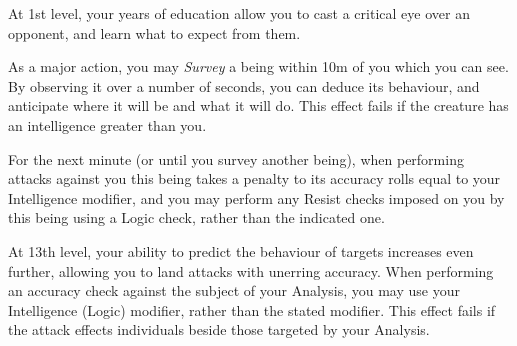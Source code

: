 {
At 1st level, your years of education allow you to cast a critical eye over an opponent, and learn what to expect from them. 

As a major action, you may {\it Survey} a being within 10m of you which you can see. By observing it over a number of seconds, you can deduce its behaviour, and anticipate where it will be and what it will do. This effect fails if the creature has an intelligence greater than you. 

For the next minute (or until you survey another being), when performing attacks against you this being takes a penalty to its accuracy rolls equal to your Intelligence modifier, and you may perform any Resist checks imposed on you by this being using a Logic check, rather than the indicated one. 


At 13th level, your ability to predict the behaviour of targets increases even further, allowing you to land attacks with unerring accuracy. When performing an accuracy check against the subject of your Analysis, you may use your Intelligence (Logic) modifier, rather than the stated modifier. This effect fails if the attack effects individuals beside those targeted by your Analysis. 
}

